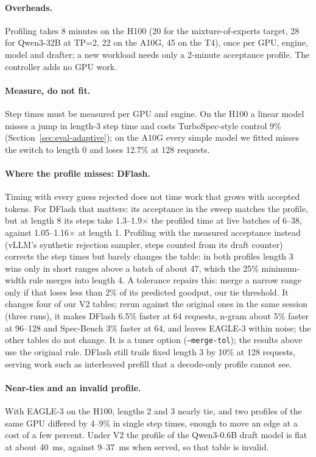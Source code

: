 \documentclass{article}
\begin{document}
\paragraph{Overheads.} Profiling takes 8 minutes on the H100 (20 for the mixture-of-experts target, 28 for Qwen3-32B at TP=2, 22 on the A10G, 45 on the T4), once per GPU, engine, model and drafter; a new workload needs only a 2-minute acceptance profile. The controller adds no GPU work.

\paragraph{Measure, do not fit.} Step times must be measured per GPU and engine. On the H100 a linear model misses a jump in length-3 step time and costs TurboSpec-style control 9\% (Section~\ref{sec:eval-adaptive}); on the A10G every simple model we fitted misses the switch to length 0 and loses 12.7\% at 128 requests.

\paragraph{Where the profile misses: DFlash.} Timing with every guess rejected does not time work that grows with accepted tokens. For DFlash that matters: its acceptance in the sweep matches the profile, but at length 8 its steps take 1.3--1.9$\times$ the profiled time at live batches of 6--38, against 1.05--1.16$\times$ at length 1. Profiling with the measured acceptance instead (vLLM's synthetic rejection sampler, steps counted from its draft counter) corrects the step times but barely changes the table: in both profiles length 3 wins only in short ranges above a batch of about 47, which the 25\% minimum-width rule merges into length 4. A tolerance repairs this: merge a narrow range only if that loses less than 2\% of its predicted goodput, our tie threshold. It changes four of our V2 tables; rerun against the original ones in the same session (three runs), it makes DFlash 6.5\% faster at 64 requests, n-gram about 5\% faster at 96--128 and Spec-Bench 3\% faster at 64, and leaves EAGLE-3 within noise; the other tables do not change. It is a tuner option (\texttt{--merge-tol}); the results above use the original rule. DFlash still trails fixed length 3 by 10\% at 128 requests, serving work such as interleaved prefill that a decode-only profile cannot see.

\paragraph{Near-ties and an invalid profile.} With EAGLE-3 on the H100, lengths 2 and 3 nearly tie, and two profiles of the same GPU differed by 4--9\% in single step times, enough to move an edge at a cost of a few percent. Under V2 the profile of the Qwen3-0.6B draft model is flat at about 40~ms, against 9--37~ms when served, so that table is invalid.
\end{document}
